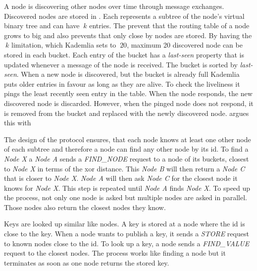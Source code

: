 A node is discovering other nodes over time through message exchanges. Discovered nodes are stored in . Each  represents a subtree of the node's virtual binary tree and can have $\ k $ entries. The  prevent that the routing table of a node grows to big and also prevents that only close by nodes are stored. By having the $\ k $ limitation, which Kademlia sets to $\ 20 $, maximum 20 discovered node can be stored in each bucket. 
Each entry of the bucket has a \textit{last-seen} property that is updated whenever a message of the node is received. The bucket is sorted by \textit{last-seen}. When a new node is discovered, but the bucket is already full Kademlia puts older entries in favour as long as they are alive. To check the liveliness it pings the least recently seen entry in the table. When the node responds, the new discovered node is discarded. However, when the pinged node does not respond, it is removed from the bucket and replaced with the newly discovered node. \citet[\S2.2]{kademlia} argues this with 

The design of the protocol ensures, that each node knows at least one other node of each subtree and therefore a node can find any other node by its id. To find a \textit{Node X} a \textit{Node A} sends a \textit{FIND\_NODE} request to a node of its buckets, closest to \textit{Node X} in terms of the \gls{xor} distance. This \textit{Node B} will then return a \textit{Node C} that is closer to \textit{Node X}. \textit{Node A} will then ask \textit{Node C} for the closest node it knows for \textit{Node X}. This step is repeated until \textit{Node A} finds \textit{Node X}. To speed up the process, not only one node is asked but multiple nodes are asked in parallel. Those nodes also return the closest nodes they know.

Keys are  looked up similar like nodes. A key is stored at a node where the id is close to the key. When a node wants to publish a key, it sends a \textit{STORE} request to known nodes close to the id.
To look up a key, a node sends a \textit{FIND\_VALUE} request to the closest nodes. The process works like finding a node but it terminates as soon as one node returns the stored key.

